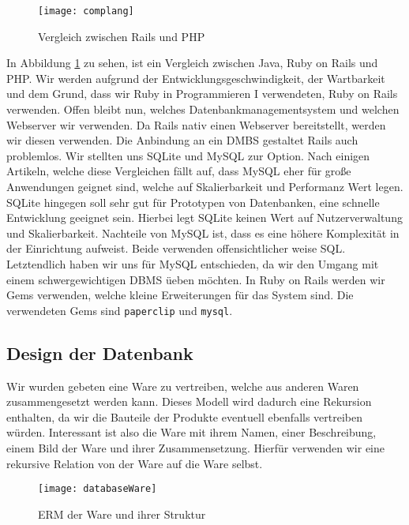 \documentclass[pdftex,10pt,a4paper]{article}
\begin{document}
\begin{figure}[h]
	\caption{Vergleich zwischen Rails und PHP}
	\cite{tbray}
	\label{fig:vergleich}
	\texttt{[image: complang]}
\end{figure}

In Abbildung \ref{fig:vergleich} zu sehen, ist ein Vergleich zwischen Java, Ruby on Rails und PHP. Wir werden aufgrund der Entwicklungsgeschwindigkeit, der Wartbarkeit und dem Grund, dass wir Ruby in Programmieren I verwendeten, Ruby on Rails verwenden. Offen bleibt nun, welches Datenbankmanagementsystem und welchen Webserver wir verwenden. Da Rails nativ einen Webserver bereitstellt, werden wir diesen verwenden. Die Anbindung an ein DMBS gestaltet Rails auch problemlos. Wir stellten uns SQLite und MySQL zur Option. Nach einigen Artikeln, welche diese Vergleichen f\"allt auf, dass MySQL eher f\"ur gro{\ss}e Anwendungen geignet sind, welche auf Skalierbarkeit und Performanz Wert legen. SQLite hingegen soll sehr gut f\"ur Prototypen von Datenbanken, eine schnelle Entwicklung geeignet sein. Hierbei legt SQLite keinen Wert auf Nutzerverwaltung und Skalierbarkeit. Nachteile von MySQL ist, dass es eine h\"ohere Komplexit\"at in der Einrichtung aufweist. Beide verwenden offensichtlicher weise SQL. Letztendlich haben wir uns f\"ur MySQL entschieden, da wir den Umgang mit einem schwergewichtigen DBMS \"ueben m\"ochten. In Ruby on Rails werden wir Gems verwenden, welche kleine Erweiterungen f\"ur das System sind. Die verwendeten Gems sind \texttt{paperclip} und \texttt{mysql}.

\subsection{Design der Datenbank}
\label{sec:dbdesign}
Wir wurden gebeten eine Ware zu vertreiben, welche aus anderen Waren zusammengesetzt werden kann. Dieses Modell wird dadurch eine Rekursion enthalten, da wir die Bauteile der Produkte eventuell ebenfalls vertreiben w\"urden. Interessant ist also die Ware mit ihrem Namen, einer Beschreibung, einem Bild der Ware und ihrer Zusammensetzung. Hierf\"ur verwenden wir eine rekursive Relation von der Ware auf die Ware selbst.  

\begin{wrapfigure}{R}{0.5\textwidth}
  	\begin{center}
    	\texttt{[image: databaseWare]}
 	 \end{center}
   \caption{ERM der Ware und ihrer Struktur}
\end{wrapfigure}
\end{document}
